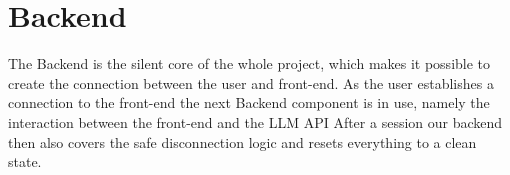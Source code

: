 \chapter{Backend}

The Backend is the silent core of the whole project, which makes it possible to create the connection between the user and front-end.
As the user establishes a connection to the front-end the next Backend component is in use, namely the interaction between the front-end and the LLM API
After a session our backend then also covers the safe disconnection logic and resets everything to a clean state. 


